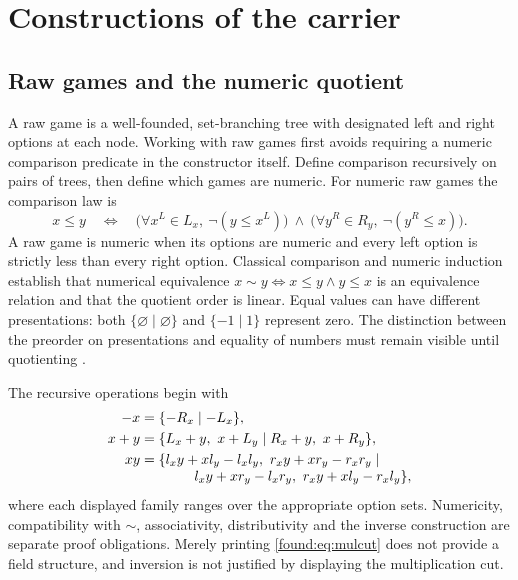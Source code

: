\documentclass[11pt,letterpaper]{article}
\numberwithin{equation}{section}
\theoremstyle{definition}
\theoremstyle{remark}
\begin{document}
\section{Constructions of the carrier}
\label{found:sec:constructions}

\subsection{Raw games and the numeric quotient}
\label{found:sub:rawgames}
A raw game is a well-founded, set-branching tree with designated left and right
options at each node. Working with raw games first avoids requiring a numeric
comparison predicate in the constructor itself. Define comparison recursively on
pairs of trees, then define which games are numeric. For numeric raw games the
comparison law is
\begin{equation}\label{found:eq:comparison}
x\le y\quad\Longleftrightarrow\quad
\bigl(\forall x^L\in L_x,\ \neg(y\le x^L)\bigr)
\ \land\
\bigl(\forall y^R\in R_y,\ \neg(y^R\le x)\bigr).
\end{equation}
A raw game is numeric when its options are numeric and every left option is
strictly less than every right option. Classical comparison and numeric
induction establish that numerical equivalence
$x\sim y\iff x\le y\land y\le x$ is an equivalence relation and that the
quotient order is linear. Equal values can have different presentations: both
$\{\varnothing\mid\varnothing\}$ and $\{-1\mid1\}$ represent zero. The
distinction between the preorder on presentations and equality of numbers must
remain visible until quotienting \cite{found:Conway}.

The recursive operations begin with
\begin{align}
 -x&=\{-R_x\mid -L_x\},\label{found:eq:negcut}\\
 x+y&=\{L_x+y,\ x+L_y\mid R_x+y,\ x+R_y\},\label{found:eq:addcut}\\
 xy&=\{l_xy+xl_y-l_xl_y,\ r_xy+xr_y-r_xr_y\mid\nonumber\\[-0.3em]
 &\hspace{3.9em}l_xy+xr_y-l_xr_y,\ r_xy+xl_y-r_xl_y\},\label{found:eq:mulcut}
\end{align}
where each displayed family ranges over the appropriate option sets.
Numericity, compatibility with $\sim$, associativity, distributivity and the
inverse construction are separate proof obligations. Merely printing
\eqref{found:eq:mulcut} does not provide a field structure, and inversion is not
justified by displaying the multiplication cut.
\end{document}

